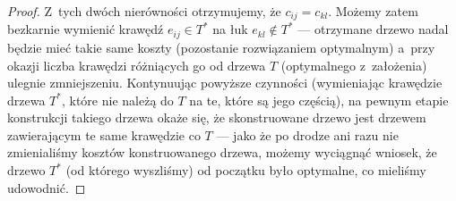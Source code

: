 \begin{proof}
	Z~tych dwóch nierówności otrzymujemy, że $c_{ij} = c_{kl}$.
	Możemy zatem bezkarnie wymienić krawędź $e_{ij} \in T^{\ast}$ na łuk $e_{kl} \notin T^{\ast}$ --- otrzymane drzewo nadal będzie mieć takie same koszty (pozostanie rozwiązaniem optymalnym) a~przy okazji liczba krawędzi różniących go od drzewa $T$ (optymalnego z~założenia) ulegnie zmniejszeniu.
	Kontynuując powyższe czynności (wymieniając krawędzie drzewa $T^{\ast}$, które nie należą do $T$ na te, które są jego częścią), na pewnym etapie konstrukcji takiego drzewa okaże się, że skonstruowane drzewo jest drzewem zawierającym te same krawędzie co $T$ --- jako że po drodze ani razu nie zmienialiśmy kosztów konstruowanego drzewa, możemy wyciągnąć wniosek, że drzewo $T^{\ast}$ (od którego wyszliśmy) od początku było optymalne, co mieliśmy udowodnić.
\end{proof}

